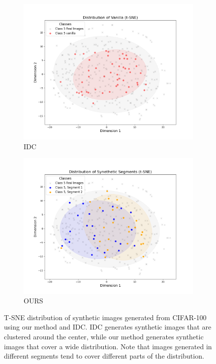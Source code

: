 \documentclass{article}
\theoremstyle{plain}
\theoremstyle{definition}
\theoremstyle{remark}
\begin{document}
\begin{figure}[t]
    \centering
    \begin{subfigure}[b]{0.23\textwidth}  %
        \centering
        \includegraphics[width=\textwidth]{./images/vanilla.png}  %
        \caption{IDC}
        \label{fig:IDC}
    \end{subfigure}
    \hfill
    \begin{subfigure}[b]{0.23\textwidth}  %
        \centering
        \includegraphics[width=\textwidth]{./images/ours.png}  %
        \caption{OURS}
        \label{fig:EDD}
    \end{subfigure}
    
    \caption{T-SNE distribution of synthetic images generated from CIFAR-100 using our method and IDC. IDC generates synthetic images that are clustered around the center, while our method generates synthetic images that cover a wide distribution. Note that images generated in different segments tend to cover different parts of the distribution.}
    \label{fig:mainfigure}
\end{figure}
\end{document}
